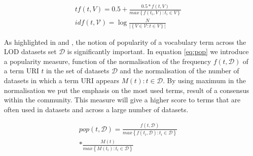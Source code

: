 \documentclass{iosart2c}
\begin{document}
\begin{equation}\label{eq:tfidf}
\begin{split}
tf(t,V) =0.5+ \frac{0.5 * f(t,V)}{max\left\{f(t_i,V): t_i \in V\right\}} \\
idf(t,\mathcal{V}) =\log\frac{N}{|\left\{V \in \mathcal{V}: t \in V\right\}|}
\end{split}
\end{equation}
 

As highlighted in \cite{butt2014} and \cite{schaible2013lover}, the notion of popularity of a vocabulary term across the LOD datasets set $\mathcal{D}$ is significantly important. In equation \ref{eq:pop} we introduce a popularity measure, function of the normalisation of the frequency $f(t,\mathcal{D})$ of a term URI $t$ in the set of datasets $\mathcal{D}$ and the normalisation of the number of datasets in which a term URI appears $M(t): t \in \mathcal{D}$. By using maximum in the normalisation we put the emphasis on the most used terms, result of a consensus within the community. This measure will give a higher score to terms that are often used in datasets and across a large number of datasets.


\begin{equation}\label{eq:pop}
\begin{split}
pop(t,\mathcal{D}) = \frac{f(t,\mathcal{D})}{max\left\{f(t_i,\mathcal{D}): t_i \in \mathcal{D}\right\}} \\
* \frac{M(t)}{max\left\{M(t_i): t_i \in \mathcal{D}\right\}}
\end{split}
\end{equation}
\end{document}
